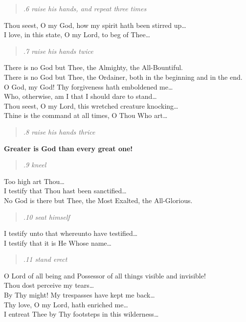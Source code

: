 \documentclass[14pt]{extarticle}
\begin{document}
\begin{hafez}{}{}
  \begin{quote}
    \emph{.6 raise his hands, and repeat three times}
  \end{quote}

  Thou seest, O my God, how my spirit hath been stirred up\dots{} \\
  I love, in this state, O my Lord, to beg of Thee\dots{}

  \begin{quote}
    \emph{.7 raise his hands twice}
  \end{quote}

  There is no God but Thee, the Almighty, the All-Bountiful. \\
  There is no God but Thee, the Ordainer, both in the beginning and in the end. \\
  O God, my God! Thy forgiveness hath emboldened me\dots{} \\
  Who, otherwise, am I that I should dare to stand\dots{} \\
  Thou seest, O my Lord, this wretched creature knocking\dots{} \\
  Thine is the command at all times, O Thou Who art\dots{}

  \newpage

  \begin{quote}
    \emph{.8 raise his hands thrice}
  \end{quote}

  \textbf{Greater is God than every great one!}

  \begin{quote}
    \emph{.9 kneel}
  \end{quote}

  Too high art Thou\dots{} \\
  I testify that Thou hast been sanctified\dots{} \\
  No God is there but Thee, the Most Exalted, the All-Glorious.

  \begin{quote}
    \emph{.10 seat himself}
  \end{quote}

  I testify unto that whereunto have testified\dots{} \\
  I testify that it is He Whose name\dots{}

  \begin{quote}
    \emph{.11 stand erect}
  \end{quote}

  O Lord of all being and Possessor of all things visible and invisible! \\
  Thou dost perceive my tears\dots{} \\
  By Thy might! My trespasses have kept me back\dots{} \\
  Thy love, O my Lord, hath enriched me\dots{} \\
  I entreat Thee by Thy footsteps in this wilderness\dots{}


\end{hafez}
\end{document}
